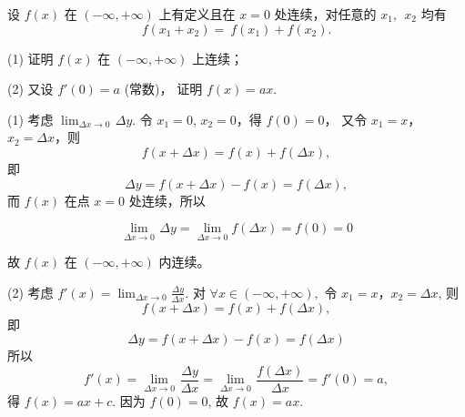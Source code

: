 \begin{problem}设 $f(x)$ 在 $( - \infty, + \infty)$ 上有定义且在 $x = 0$
处连续，对任意的 $x_{1},\ \ x_{2}$ 均有
	$$f\left( x_{1} + x_{2} \right) = {\ f}\left( x_{1} \right) + f\left( x_{2} \right).$$

(1) 证明 $f\left( x \right)$ 在 $( - \infty, + \infty)$ 上连续；

(2) 又设 $f'\left( 0 \right) = a$ (常数)， 证明
$f\left( x \right) = ax$.

\begin{solution}
(1) 考虑
$\displaystyle \lim_{\Delta x \rightarrow 0}\mspace{2mu}\Delta y$.
令 $x_{1} = 0$, $x_{2} = 0$，得 $f\left( 0 \right) = 0$，
又令 $x_{1} = x$，$x_{2} = \Delta x$，则
$$f\left( x + \Delta x \right) = f\left( x \right) + f(\Delta x),$$
即 $$\Delta y = f\left( x + \Delta x \right) - f(x) = f(\Delta x),$$
而
$f\left( x \right)$ 在点 $x = 0$ 处连续，所以

$$\lim_{\Delta x \rightarrow 0}\mspace{2mu}\Delta y = \lim_{\Delta x \rightarrow 0}f\left( {\Delta x} \right) = f\left( 0 \right) = 0$$

故 $f(x)$ 在 $( - \infty, + \infty)$ 内连续。

(2) 考虑
$\displaystyle f'(x) = \lim_{\Delta x \rightarrow 0}\frac{\Delta y}{\Delta x}$.
对 $\forall x \in \left( - \infty, + \infty \right),$ 令
$x_{1} = x$，$x_{2} = \Delta x$,
则 
$$f\left( x + \Delta x \right) = f\left( x \right) + f(\Delta x),$$
即 $$\Delta y = f\left( x + \Delta x \right) - f(x) = f(\Delta x)$$
所以
$$f'(x) = \lim_{\Delta x \rightarrow 0}\mspace{2mu}\frac{\Delta y}{\Delta x} = \lim_{\Delta x \rightarrow 0}\mspace{2mu}\frac{f(\Delta x)}{\Delta x} = f'(0) = a,$$
得
$f\left( x \right) = ax + c$. 因为 $f\left( 0 \right) = 0$,
故 $f\left( x \right) = ax$.
\end{solution}


\end{problem}          

